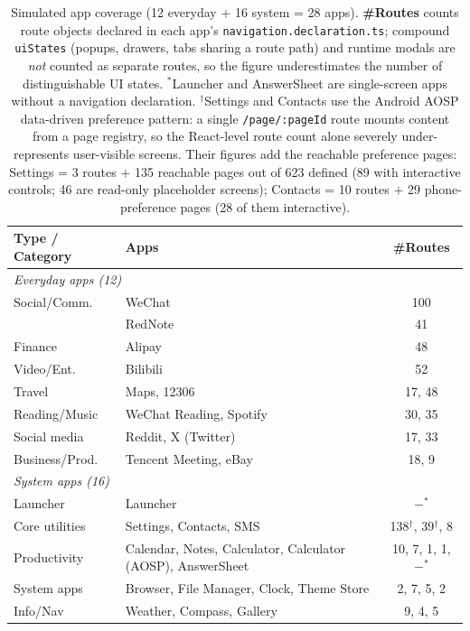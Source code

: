 \documentclass{llmxive}
\begin{document}
\begin{table}[!htbp]
  \centering\small
  \setlength{\tabcolsep}{3pt}
  \begin{tabular}{lp{2.7cm}c}
    \toprule
    \textbf{Type / Category} & \textbf{Apps} & \textbf{\#Routes} \\
    \midrule
    \multicolumn{3}{l}{\textit{Everyday apps (12)}} \\
    Social/Comm.    & WeChat       & 100 \\
                    & RedNote      & 41 \\
    Finance         & Alipay       & 48 \\
    Video/Ent.      & Bilibili     & 52 \\
    Travel          & Maps, 12306  & 17, 48 \\
    Reading/Music   & WeChat Reading, Spotify & 30, 35 \\
    Social media    & Reddit, X (Twitter) & 17, 33 \\
    Business/Prod.  & Tencent Meeting, eBay & 18, 9 \\
    \midrule
    \multicolumn{3}{l}{\textit{System apps (16)}} \\
    Launcher        & Launcher     & $-^\ast$ \\
    Core utilities  & Settings, Contacts, SMS & 138$^\dagger$, 39$^\dagger$, 8 \\
    Productivity    & Calendar, Notes, Calculator, Calculator (AOSP), AnswerSheet & 10, 7, 1, 1, $-^\ast$ \\
    System apps     & Browser, File Manager, Clock, Theme Store & 2, 7, 5, 2 \\
    Info/Nav        & Weather, Compass, Gallery & 9, 4, 5 \\
    \bottomrule
  \end{tabular}
  \caption{Simulated app coverage (12 everyday + 16 system = 28 apps). \textbf{\#Routes} counts route objects declared in each app's \texttt{navigation.declaration.ts}; compound \texttt{uiStates} (popups, drawers, tabs sharing a route path) and runtime modals are \textit{not} counted as separate routes, so the figure underestimates the number of distinguishable UI states. $^\ast$Launcher and AnswerSheet are single-screen apps without a navigation declaration. $^\dagger$Settings and Contacts use the Android AOSP data-driven preference pattern: a single \texttt{/page/:pageId} route mounts content from a page registry, so the React-level route count alone severely under-represents user-visible screens. Their figures add the reachable preference pages: Settings = 3 routes $+$ 135 reachable pages out of 623 defined (89 with interactive controls; 46 are read-only placeholder screens); Contacts = 10 routes $+$ 29 phone-preference pages (28 of them interactive).}
  \label{tab:apps}
\end{table}
\end{document}
